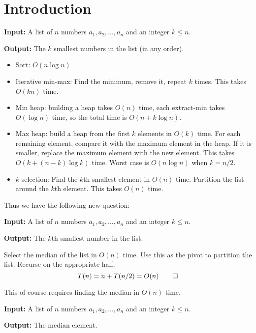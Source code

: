 \chapter{Introduction} \label{chp:intro}
\begin{question}
    \textbf{Input:} A list of $n$ numbers $a_1, a_2, \dots, a_n$ and
    an integer $k \le n$.

    \textbf{Output:} The $k$ smallest numbers in the list (in any order).
\end{question}
\begin{itemize}
    \item Sort: $O(n \log n)$
    \item Iterative min-max: Find the minimum, remove it, repeat $k$ times.
        This takes $O(kn)$ time.
    \item Min heap: building a heap takes $O(n)$ time,
        each extract-min takes $O(\log n)$ time,
        so the total time is $O(n + k \log n)$.
    \item Max heap: build a heap from the first $k$ elements in $O(k)$ time.
        For each remaining element, compare it with the maximum element in
        the heap.
        If it is smaller, replace the maximum element with the new element.
        This takes $O(k + (n-k) \log k)$ time.
        Worst case is $O(n \log n)$ when $k = n/2$.
    \item $k$-selection: Find the $k$th smallest element in $O(n)$ time.
        Partition the list around the $k$th element.
        This takes $O(n)$ time.
\end{itemize}

Thus we have the following new question:
\begin{question}
    \textbf{Input:} A list of $n$ numbers $a_1, a_2, \dots, a_n$ and
    an integer $k \le n$.

    \textbf{Output:} The $k$th smallest number in the list.
\end{question}
\begin{solution}
    Select the median of the list in $O(n)$ time.
    Use this as the pivot to partition the list.
    Recurse on the appropriate half.
    \[
        T(n) = n + T(n/2) = O(n) \qedhere
    \]
\end{solution}
This of course requires finding the median in $O(n)$ time.
\begin{question}
    \textbf{Input:} A list of $n$ numbers $a_1, a_2, \dots, a_n$ and an
    integer $k \le n$.

    \textbf{Output:} The median element.
\end{question}
\begin{solution}
    
\end{solution}
